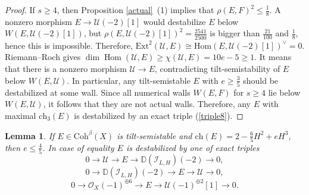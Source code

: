 \documentclass{amsart}
\DeclareMathOperator{\Hom}{Hom}
\newtheorem{lemma}[theorem]{Lemma}
\begin{document}
\begin{proof}
		If $s\ge 4$, then Proposition \ref{actual}~(1) implies that $\rho(E,F)^2\le\frac 18$. A nonzero morphism $E\to\mathcal U(-2)[1]$ would destabilize $E$ below $W(E,\mathcal U(-2)[1])$, but $\rho(E,\mathcal U(-2)[1])^2=\frac{2541}{2500}$ is bigger than $\frac{21}{100}$ and $\frac 18$, hence this is impossible. Therefore, $\mathrm{Ext}^2(\mathcal U,E)\cong\mathrm{Hom}(E,\mathcal U(-2)[1])^\vee=0$. Riemann--Roch gives $\dim \Hom(\mathcal U,E)\ge\chi(\mathcal U,E)=10e-5\ge 1$. It means that there is a nonzero morphism $\mathcal U\to E$, contradicting tilt-semistability of $E$ below $W(E,\mathcal U)$. In particular, any tilt-semistable $E$ with $e\ge\frac 35$ should be destabilized at some wall. Since all numerical walls $W(E,F)$ for $s\ge 4$ lie below $W(E,\mathcal U)$, it follows that they are not actual walls. Therefore, any $E$ with maximal $\mathrm{ch}_3(E)$ is destabilized by an exact triple (\ref{triple8}).
	\end{proof}
	
	\begin{lemma}\label{2 0 -6/5} If $E\in\mathrm{Coh}^\beta(X)$ is tilt-semistable and $\mathrm{ch}(E)=2-\frac 65H^2+eH^3$, then $e\le\frac 45$. In case of equality $E$ is destabilized by one of exact triples
		\begin{equation}\label{triple10}0\to\mathcal U\to E\to \mathbb D(\mathcal I_{L,H})(-2)\to 0,
		\end{equation}
		\begin{equation}\label{triple11}0\to \mathbb D(\mathcal I_{L,H})(-2)\to E\to\mathcal U\to 0,
		\end{equation}
		\begin{equation}\label{triple12}0\to\mathcal O_X(-1)^{\oplus 6}\to E\to\mathcal U(-1)^{\oplus 2}[1]\to 0.
		\end{equation}
	\end{lemma}
	
\end{document}
